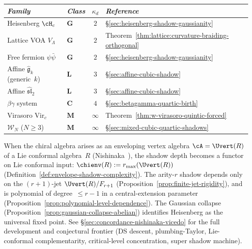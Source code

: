 \begin{example}
\label{ex:shadow-depth-all-families}
\begin{center}
\small
\renewcommand{\arraystretch}{1.15}
\begin{tabular}{llcl}
\toprule
\emph{Family} &
\emph{Class} &
$\kappa_d$ &
\emph{Reference} \\
\midrule
Heisenberg $\cH_c$ &
  $\mathbf{G}$ & $2$ &
  \S\ref{sec:heisenberg-shadow-gaussianity} \\
Lattice VOA $V_\Lambda$ &
  $\mathbf{G}$ & $2$ &
  Theorem~\ref{thm:lattice:curvature-braiding-orthogonal} \\
Free fermion $\psi\bar\psi$ &
  $\mathbf{G}$ & $2$ &
  \S\ref{sec:heisenberg-shadow-gaussianity} \\[3pt]
Affine $\hat{\mathfrak{g}}_k$ (generic~$k$) &
  $\mathbf{L}$ & $3$ &
  \S\ref{sec:affine-cubic-shadow} \\
Affine $\hat{\mathfrak{sl}}_2$ &
  $\mathbf{L}$ & $3$ &
  \S\ref{sec:affine-cubic-shadow} \\[3pt]
$\beta\gamma$ system &
  $\mathbf{C}$ & $4$ &
  \S\ref{sec:betagamma-quartic-birth} \\[3pt]
Virasoro $\mathrm{Vir}_c$ &
  $\mathbf{M}$ & $\infty$ &
  Theorem~\ref{thm:w-virasoro-quintic-forced} \\
$\mathcal{W}_N$ ($N \geq 3$) &
  $\mathbf{M}$ & $\infty$ &
  \S\ref{sec:mixed-cubic-quartic-shadows} \\
\bottomrule
\end{tabular}
\end{center}
\end{example}

\begin{remark}
\label{rem:envelope-shadow-functor-xref}
When the chiral algebra arises as an enveloping vertex algebra
$\cA = \Uvert(R)$ of a Lie conformal algebra~$R$
(Nishinaka~\cite{Nish26}), the shadow depth becomes a functor
on Lie conformal input:
$\chienv(R) := r_{\max}(\Uvert(R))$
(Definition~\ref{def:envelope-shadow-complexity}).
The arity-$r$ shadow depends only on the $(r{+}1)$-jet
$\Uvert(R)/F_{r+1}$
(Proposition~\ref{prop:finite-jet-rigidity}), and is
polynomial of degree~$\leq r{-}1$ in a central-extension
parameter
(Proposition~\ref{prop:polynomial-level-dependence}).
The Gaussian collapse
(Proposition~\ref{prop:gaussian-collapse-abelian})
identifies Heisenberg as the universal fixed point.
See \S\ref{sec:concordance-nishinaka-vicedo} for the full
development and conjectural frontier (DS descent, plumbing-Taylor,
Lie-conformal complementarity, critical-level concentration,
super shadow machine).
\end{remark}

